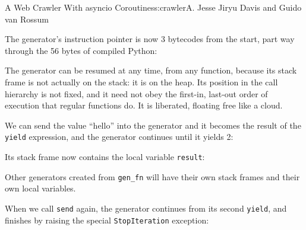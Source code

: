 \begin{aosachapter}{A Web Crawler With asyncio Coroutines}{s:crawler}{A. Jesse Jiryu Davis and Guido van Rossum}
\begin{Shaded}
\begin{Highlighting}[]
\NormalTok{)}
\end{Highlighting}
\end{Shaded}

The generator's instruction pointer is now 3 bytecodes from the start,
part way through the 56 bytes of compiled Python:

\begin{Shaded}
\begin{Highlighting}[]
\NormalTok{>>> }
\end{Highlighting}
\end{Shaded}

The generator can be resumed at any time, from any function, because its
stack frame is not actually on the stack: it is on the heap. Its
position in the call hierarchy is not fixed, and it need not obey the
first-in, last-out order of execution that regular functions do. It is
liberated, floating free like a cloud.

We can send the value ``hello'' into the generator and it becomes the
result of the \texttt{yield} expression, and the generator continues
until it yields 2:

\begin{Shaded}
\begin{Highlighting}[]
\NormalTok{)}
\end{Highlighting}
\end{Shaded}

Its stack frame now contains the local variable \texttt{result}:

\begin{Shaded}
\begin{Highlighting}[]
\NormalTok{\{}\NormalTok{: }\NormalTok{\}}
\end{Highlighting}
\end{Shaded}

Other generators created from \texttt{gen\_fn} will have their own stack
frames and their own local variables.

When we call \texttt{send} again, the generator continues from its
second \texttt{yield}, and finishes by raising the special
\texttt{StopIteration} exception:


\end{aosachapter}
